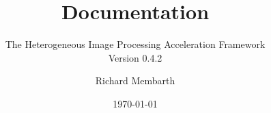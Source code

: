 


\title{\hipacc{} Documentation}
\subtitle{The Heterogeneous Image Processing Acceleration Framework\\Version 0.4.2}
\author{Richard Membarth}
\date{\today}

\maketitle

\cleardoublepage
\tableofcontents
\cleardoublepage






\nocite{membarth2011ggc}
\nocite{membarth2012gdg}
\nocite{membarth2012aoi}
\cleardoublepage
\appendix





